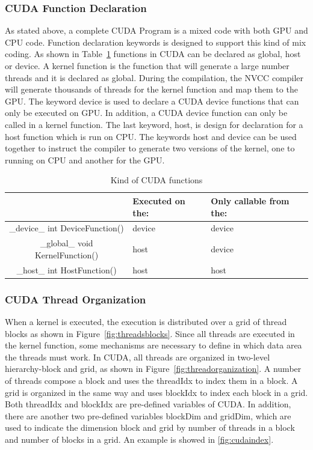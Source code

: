 \documentclass[Ingles]{ic-tese-v1}
\newcommand{\rfig}[1]{Figure~\ref{fig:#1}}
\begin{document}
\subsubsection{CUDA Function Declaration}
\label{CUDAfunction}

As stated above, a complete CUDA Program is a mixed code with both GPU and CPU
code. Function declaration keywords is designed to support this kind of mix coding. As
shown in Table~\ref{tab:cudaFunction} functions in CUDA can be declared as global, host or device. A kernel
function is the function that will generate a large number threads and it is declared as
global. During the compilation, the NVCC compiler will generate thousands of threads for
the kernel function and map them to the GPU. The keyword device is used to declare a CUDA device
functions that can only be executed on GPU. In addition, a CUDA device function can
only be called in a kernel function. The last keyword, host, is design for declaration for a
host function which is run on CPU. The keywords host and device can be used  together to instruct the compiler to generate two versions of the kernel, one to running on CPU and another for the GPU.

\begin{table}[!t]
	\caption[small]{Kind of CUDA functions}
\begin{center}
	\begin{tabular}{ | c | >{\centering\arraybackslash}p{2cm} | >{\centering\arraybackslash}p{3cm} |}
		\hline
		 & Executed on the: & Only callable from the: \\ \hline
		{\color{blue} \_device\_} int DeviceFunction() & device & device \\ \hline
		{\color{blue} \_global\_} void KernelFunction()& host & device \\ \hline
		{\color{blue} \_host\_} int HostFunction() & host & host\\
		\hline
	\end{tabular}
\end{center}
\label{tab:cudaFunction}
\end{table}

\subsubsection{CUDA Thread Organization}
\label{CUDA Thread Organization}
When a kernel is executed, the execution is distributed over a grid of thread
blocks as shown in \rfig{threadsblocks}. Since all threads are executed in the kernel function, some mechanisms are necessary to define in which data area the threads must work. In CUDA, all threads are organized in two-level hierarchy-block and grid, as shown in \rfig{threadorganization}. A number of threads compose a block and uses the threadIdx to index them in a block. A grid is organized in the same way and uses blockIdx to index each block in a grid. Both threadIdx and blockIdx are pre-defined variables of CUDA. In addition, there are another two pre-defined variables blockDim and gridDim, which are used to indicate the dimension block and grid by number of threads in a block and number of blocks in a grid. An example is showed in \ref{fig:cudaindex}.
\end{document}
